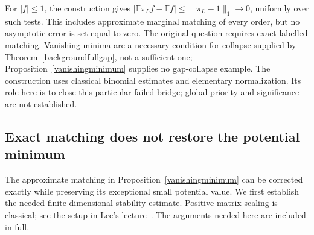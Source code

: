 \documentclass[11pt]{article}
\newcommand{\E}{\mathbb E}
\begin{document}
For $|f|\leq1$, the construction gives
$|\E\pi_L f-\E f|\leq\|\pi_L-1\|_1\to0$, uniformly over such tests.
This includes approximate marginal matching of every order, but no
asymptotic error is set equal to zero. The original question requires
exact labelled matching. Vanishing minima are a necessary condition for
collapse supplied by Theorem~\ref{backgroundfullgap}, not a sufficient
one; Proposition~\ref{vanishingminimum} supplies no gap-collapse example.
The construction uses classical binomial estimates and elementary
normalization. Its role here is to close this particular failed bridge;
global priority and significance are not established.

\subsection{Exact matching does not restore the potential minimum}
The approximate matching in Proposition~\ref{vanishingminimum} can be
corrected exactly while preserving its exceptional small potential value.
We first establish the needed finite-dimensional stability estimate.
Positive matrix scaling is classical; see the setup in Lee's
lecture~\cite{lee2016}. The arguments needed here are included in full.
\end{document}
